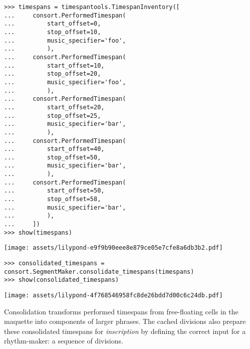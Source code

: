 \begin{abjadbookoutput}
\begin{singlespacing}
\vspace{-0.5\baselineskip}
\begin{verbatim}
>>> timespans = timespantools.TimespanInventory([
...     consort.PerformedTimespan(
...         start_offset=0,
...         stop_offset=10,
...         music_specifier='foo',
...         ),
...     consort.PerformedTimespan(
...         start_offset=10,
...         stop_offset=20,
...         music_specifier='foo',
...         ),
...     consort.PerformedTimespan(
...         start_offset=20,
...         stop_offset=25,
...         music_specifier='bar',
...         ),
...     consort.PerformedTimespan(
...         start_offset=40,
...         stop_offset=50,
...         music_specifier='bar',
...         ),
...     consort.PerformedTimespan(
...         start_offset=50,
...         stop_offset=58,
...         music_specifier='bar',
...         ),
...     ])
>>> show(timespans)
\end{verbatim}
\noindent\texttt{[image: assets/lilypond-e9f9b90eee8e879ce05e7cfe8a6db3b2.pdf]}
\begin{verbatim}
>>> consolidated_timespans = consort.SegmentMaker.consolidate_timespans(timespans)
>>> show(consolidated_timespans)
\end{verbatim}
\noindent\texttt{[image: assets/lilypond-4f768546958fc8de26bdd7d00c6c24db.pdf]}
\end{singlespacing}
\end{abjadbookoutput}

\noindent Consolidation transforms performed timespans from free-floating cells
in the maquette into components of larger phrases. The cached divisions also
prepare these consolidated timespans for \emph{inscription} by defining the
correct input for a rhythm-maker: a sequence of divisions.

\begin{comment}
<abjad>
print(format(consolidated_timespans))
</abjad>
\end{comment}

